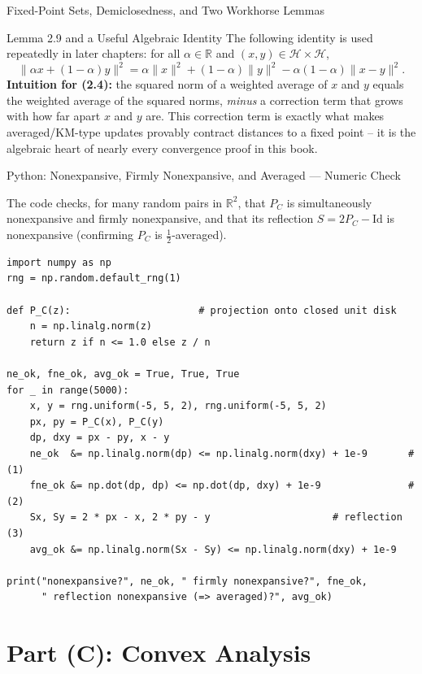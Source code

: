 \documentclass[aspectratio=169,10pt]{beamer}
\newcommand{\Id}{\mathrm{Id}}
\newcommand{\R}{\mathbb{R}}
\begin{document}
\begin{frame}[allowframebreaks]{Fixed-Point Sets, Demiclosedness, and Two Workhorse Lemmas}
\begin{block}{Lemma 2.9 and a Useful Algebraic Identity}
    \medskip
    The following identity is used repeatedly in later chapters: for all
    $\alpha \in \R$ and $(x,y) \in \mathcal{H} \times \mathcal{H}$,
    \[
      \|\alpha x + (1-\alpha)y\|^2 = \alpha\|x\|^2 + (1-\alpha)\|y\|^2
        - \alpha(1-\alpha)\|x-y\|^2. \tag{2.4}
    \]
    \textbf{Intuition for (2.4):} the squared norm of a weighted average
    of $x$ and $y$ equals the weighted average of the squared norms,
    \emph{minus} a correction term that grows with how far apart $x$ and $y$
    are. This correction term is exactly what makes averaged/KM-type updates
    provably contract distances to a fixed point -- it is the algebraic
    heart of nearly every convergence proof in this book.
  \end{block}

\end{frame}

\begin{frame}[fragile]{Python: Nonexpansive, Firmly Nonexpansive, and Averaged --- Numeric Check}

The code checks, for many random pairs in $\R^2$, that $P_C$ is simultaneously
nonexpansive and firmly nonexpansive, and that its reflection
$S = 2P_C - \Id$ is nonexpansive (confirming $P_C$ is $\tfrac12$-averaged).

\begin{lstlisting}[style=pycode]
import numpy as np
rng = np.random.default_rng(1)

def P_C(z):                      # projection onto closed unit disk
    n = np.linalg.norm(z)
    return z if n <= 1.0 else z / n

ne_ok, fne_ok, avg_ok = True, True, True
for _ in range(5000):
    x, y = rng.uniform(-5, 5, 2), rng.uniform(-5, 5, 2)
    px, py = P_C(x), P_C(y)
    dp, dxy = px - py, x - y
    ne_ok  &= np.linalg.norm(dp) <= np.linalg.norm(dxy) + 1e-9       # (1)
    fne_ok &= np.dot(dp, dp) <= np.dot(dp, dxy) + 1e-9               # (2)
    Sx, Sy = 2 * px - x, 2 * py - y                     # reflection (3)
    avg_ok &= np.linalg.norm(Sx - Sy) <= np.linalg.norm(dxy) + 1e-9

print("nonexpansive?", ne_ok, " firmly nonexpansive?", fne_ok,
      " reflection nonexpansive (=> averaged)?", avg_ok)
\end{lstlisting}

\end{frame}

\section{Part (C): Convex Analysis}
\end{document}
